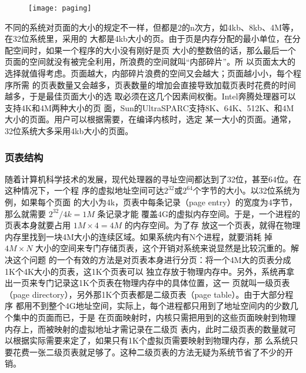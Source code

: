 \documentclass{swfuthesism}
\begin{document}
\begin{figure}[!ht]
  \centering
  \begin{center}
    \texttt{[image: paging]}
  \end{center}
  \label{fig:paging}
\end{figure}

不同的系统对页面的大小的规定不一样，但都是2的n次方，如4kb、8kb、4M等，在32位系统里，采用的
大都是4kb大小的页。由于页是内存分配的最小单位，在分配空间时，如果一个程序的大小没有刚好是页
大小的整数倍的话，那么最后一个页面的空间就没有被完全利用，所浪费的空间就叫``内部碎片''。所
以页面太大的选择就值得考虑。页面越大，内部碎片浪费的空间又会越大；页面越小小，每个程序所需
的页表数量又会越多，页表数量的增加会直接导致加载页表时花费的时间越多，于是最佳页面大小的选
取必须在这几个因素间权衡。Intel奔腾处理器可以支持4K和4M两种大小的页
面，Sun的UltraSPARC支持8K、64K、512K、和4M大小的页面。用户可以根据需要，在编译内核时，选定
某一大小的页面\cite{silberschatz11essentials}。通常，32位系统大多采用4kb大小的页面。

\subsubsection{页表结构}

随着计算机科学技术的发展，现代处理器的寻址空间都达到了32位，甚至64位。在这种情况下，一个程
序的虚拟地址空间可达$2^{32}$或$2^{64}$个字节的大小\cite{zos}。以32位系统为例，如果每个页面
的大小为4k，页表中每条记录（page entry）的宽度为4字节，那么就需要 $2^{32}/4k=1M$ 条记录才能
覆盖4G的虚拟内存空间。于是，一个进程的页表本身就要占用 $1M\times 4 = 4M$ 的内存空间。为了存
放这一个页表，就得在物理内存里找到一块4M大小的连续区域。如果系统内有N个进程，就要消耗
掉 $4M\times{}N$ 大小的空间来专门存储页表，这个开销对系统来说显然是比较沉重的。解决这个问题
的一个有效的方法是对页表本身进行分页：将一个4M大的页表分成1K个4K大小的页表，这1K个页表可以
独立存放于物理内存中。另外，系统再拿出一页来专门记录这1K个页表在物理内存中的具体位置，这一
页就叫一级页表（page directory），另外那1K个页表都是二级页表（page table）。由于大部分程序
都用不到整个4G地址空间，实际上，每个进程都只用到了地址空间内的少数几个集中的页面而已，于是
在页面映射时，内核只需把用到的这些页面映射到物理内存上，而被映射的虚拟地址才需记录在二级页
表内，此时二级页表的数量就可以根据实际需要来定了，如果只有1K个虚拟页需要映射到物理内存，那
么系统只要花费一张二级页表就足够了。这种二级页表的方法无疑为系统节省了不少的开销。
\end{document}
